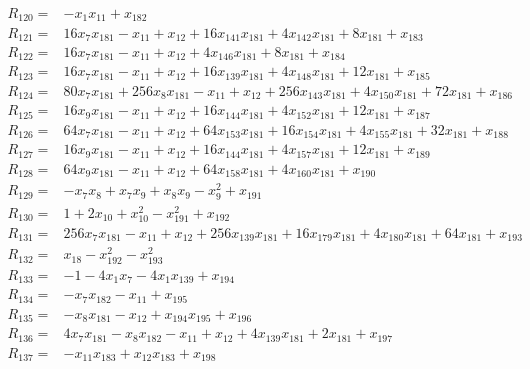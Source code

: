 \begin{align*}
R_{120}={}&-x_{1}x_{11}+x_{182}\\[3pt]
R_{121}={}&16x_{7}x_{181}-x_{11}+x_{12}+16x_{141}x_{181}+4x_{142}x_{181}+8x_{181}+x_{183}\\[3pt]
R_{122}={}&16x_{7}x_{181}-x_{11}+x_{12}+4x_{146}x_{181}+8x_{181}+x_{184}\\[3pt]
R_{123}={}&16x_{7}x_{181}-x_{11}+x_{12}+16x_{139}x_{181}+4x_{148}x_{181}+12x_{181}+x_{185}\\[3pt]
R_{124}={}&80x_{7}x_{181}+256x_{8}x_{181}-x_{11}+x_{12}+256x_{143}x_{181}+4x_{150}x_{181}+72x_{181}+x_{186}\\[3pt]
R_{125}={}&16x_{9}x_{181}-x_{11}+x_{12}+16x_{144}x_{181}+4x_{152}x_{181}+12x_{181}+x_{187}\\[3pt]
R_{126}={}&64x_{7}x_{181}-x_{11}+x_{12}+64x_{153}x_{181}+16x_{154}x_{181}+4x_{155}x_{181}+32x_{181}+x_{188}\\[3pt]
R_{127}={}&16x_{9}x_{181}-x_{11}+x_{12}+16x_{144}x_{181}+4x_{157}x_{181}+12x_{181}+x_{189}\\[3pt]
R_{128}={}&64x_{9}x_{181}-x_{11}+x_{12}+64x_{158}x_{181}+4x_{160}x_{181}+x_{190}\\[3pt]
R_{129}={}&-x_{7}x_{8}+x_{7}x_{9}+x_{8}x_{9}-x_{9}^{2}+x_{191}\\[3pt]
R_{130}={}&1+2x_{10}+x_{10}^{2}-x_{191}^{2}+x_{192}\\[3pt]
R_{131}={}&256x_{7}x_{181}-x_{11}+x_{12}+256x_{139}x_{181}+16x_{179}x_{181}+4x_{180}x_{181}+64x_{181}+x_{193}\\[3pt]
R_{132}={}&x_{18}-x_{192}^{2}-x_{193}^{2}\\[3pt]
R_{133}={}&-1-4x_{1}x_{7}-4x_{1}x_{139}+x_{194}\\[3pt]
R_{134}={}&-x_{7}x_{182}-x_{11}+x_{195}\\[3pt]
R_{135}={}&-x_{8}x_{181}-x_{12}+x_{194}x_{195}+x_{196}\\[3pt]
R_{136}={}&4x_{7}x_{181}-x_{8}x_{182}-x_{11}+x_{12}+4x_{139}x_{181}+2x_{181}+x_{197}\\[3pt]
R_{137}={}&-x_{11}x_{183}+x_{12}x_{183}+x_{198}\\[3pt]

\end{align*}
